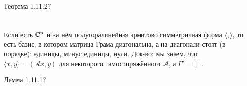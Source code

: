 Теорема 1.11.2? \TODO

\section{} %
Если есть $\mathbb{C}^n$ и на нём полуторалинейная эрмитово симметричная форма $\langle , \rangle$, то есть
базис, в котором матрица Грама диагональна, а на диагонали стоят (в порядке): единицы, минус единицы, нули.
Док-во: мы знаем, что $\langle x, y \rangle = (\mathcal Ax, y)$ для некоторого самосопряжённого $\mathcal A$,
а $\Gamma' = [\mathcal]^\top$. \TODO

Лемма 1.11.1? \TODO

\section{} %

\TODO

